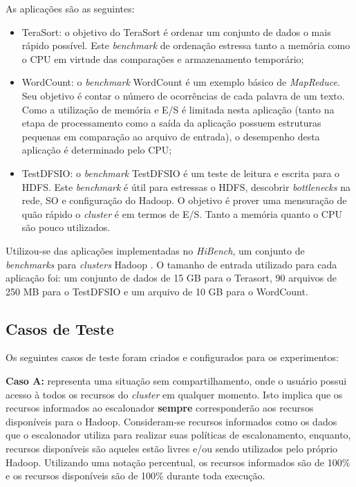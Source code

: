 As aplicações são as seguintes:
\begin{itemize}
	\item TeraSort: o objetivo do TeraSort \citep{TeraSort2008} é ordenar um conjunto de dados o mais rápido possível. Este \textit{benchmark} de ordenação estressa tanto a memória como o CPU em virtude das comparações e armazenamento temporário;
	\item WordCount: o \textit{benchmark} WordCount é um exemplo básico de \textit{MapReduce}. Seu objetivo é contar o número de ocorrências de cada palavra de um texto. Como a utilização de memória e E/S é limitada nesta aplicação (tanto na etapa de processamento como a saída da aplicação possuem estruturas pequenas em comparação ao arquivo de entrada), o desempenho desta aplicação é determinado pelo CPU;
	\item TestDFSIO: o \textit{benchmark} TestDFSIO é um teste de leitura e escrita para o HDFS. Este \textit{benchmark} é útil para estressas o HDFS, descobrir \textit{bottlenecks} na rede, SO e configuração do Hadoop. O objetivo é prover uma mensuração de quão rápido o \textit{cluster} é em termos de E/S. Tanto a memória quanto o CPU são pouco utilizados.
\end{itemize}

Utilizou-se das aplicações implementadas no \textit{HiBench}, um conjunto de \textit{benchmarks} para \textit{clusters} Hadoop \cite{HiBench}. O tamanho de entrada utilizado para cada aplicação foi: um conjunto de dados de 15 GB para o Terasort, 90 arquivos de 250 MB para o TestDFSIO e um arquivo de 10 GB para o WordCount. 

\subsection{Casos de Teste}
Os seguintes casos de teste foram criados e configurados para os experimentos:

\textbf{Caso A:} representa uma situação sem compartilhamento, onde o usuário possui acesso à todos os recursos do \textit{cluster} em qualquer momento. Isto implica que os recursos informados ao escalonador \textbf{sempre} corresponderão aos recursos disponíveis para o Hadoop. Consideram-se recursos informados como os dados que o escalonador utiliza para realizar suas políticas de escalonamento, enquanto, recursos disponíveis são aqueles estão livres e/ou sendo utilizados pelo próprio Hadoop. Utilizando uma notação percentual, os recursos informados são de 100\% e os recursos disponíveis são de 100\% durante toda execução.

